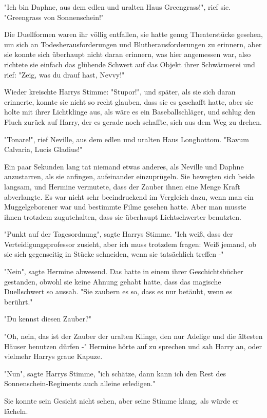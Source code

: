 {"Ich bin Daphne, aus dem edlen und uralten Haus Greengrass!", rief sie. "Greengrass von Sonnenschein!"

Die Duellformen waren ihr völlig entfallen, sie hatte genug Theaterstücke gesehen, um sich an Todesherausforderungen und Blutherausforderungen zu erinnern, aber sie konnte sich überhaupt nicht daran erinnern, was hier angemessen war, also richtete sie einfach das glühende Schwert auf das Objekt ihrer Schwärmerei und rief: "Zeig, was du drauf hast, Nevvy!"

Wieder kreischte Harrys Stimme: "Stupor!", und später, als sie sich daran erinnerte, konnte sie nicht so recht glauben, dass sie es geschafft hatte, aber sie holte mit ihrer Lichtklinge aus, als wäre es ein Baseballschläger, und schlug den Fluch zurück auf Harry, der es gerade noch schaffte, sich aus dem Weg zu drehen.

"Tonare!", rief Neville, aus dem edlen und uralten Haus Longbottom. "Ravum Calvaria, Lucis Gladius!"

Ein paar Sekunden lang tat niemand etwas anderes, als Neville und Daphne anzustarren, als sie anfingen, aufeinander einzuprügeln. Sie bewegten sich beide langsam, und Hermine vermutete, dass der Zauber ihnen eine Menge Kraft abverlangte. Es war nicht sehr beeindruckend im Vergleich dazu, wenn man ein Muggelgeborener war und bestimmte Filme gesehen hatte. Aber man musste ihnen trotzdem zugutehalten, dass sie überhaupt Lichtschwerter benutzten.

"Punkt auf der Tagesordnung", sagte Harrys Stimme. "Ich weiß, dass der Verteidigungsprofessor zusieht, aber ich muss trotzdem fragen: Weiß jemand, ob sie sich gegenseitig in Stücke schneiden, wenn sie tatsächlich treffen -"

"Nein", sagte Hermine abwesend. Das hatte in einem ihrer Geschichtsbücher gestanden, obwohl sie keine Ahnung gehabt hatte, dass das magische Duellschwert so aussah. "Sie zaubern es so, dass es nur betäubt, wenn es berührt."

"Du kennst diesen Zauber?"

"Oh, nein, das ist der Zauber der uralten Klinge, den nur Adelige und die ältesten Häuser benutzen dürfen -" Hermine hörte auf zu sprechen und sah Harry an, oder vielmehr Harrys graue Kapuze.

"Nun", sagte Harrys Stimme, "ich schätze, dann kann ich den Rest des Sonnenschein-Regiments auch alleine erledigen."

Sie konnte sein Gesicht nicht sehen, aber seine Stimme klang, als würde er lächeln.

}
